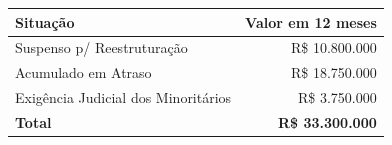 \begin{tabular}{@{}p{}r@{}}
\toprule
\textbf{Situação} & \textbf{Valor em 12 meses} \\
\midrule
Suspenso p/ Reestruturação & R\$ 10.800.000 \\
Acumulado em Atraso & R\$ 18.750.000 \\
Exigência Judicial dos Minoritários & R\$ 3.750.000 \\
\textbf{Total} & \textbf{R\$ 33.300.000} \\
\bottomrule
\end{tabular}
